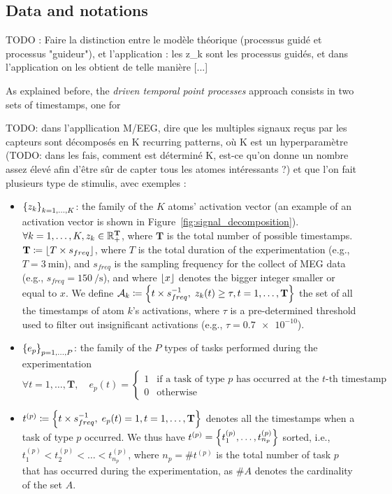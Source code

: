 \subsection{Data and notations}

TODO : Faire la distinction entre le modèle théorique (processus guidé et processus "guideur"), et l'application : les z\_k sont les processus guidés, et dans l'application on les obtient de telle manière [...] 

As explained before, the \textit{driven temporal point processes} approach consists in two sets of timestamps, one for 

TODO: dans l'appllication M/EEG, dire que les multiples signaux reçus par les capteurs sont décomposés en K recurring patterns, où K est un hyperparamètre (TODO: dans les fais, comment est déterminé K, est-ce qu'on donne un nombre assez élevé afin d'être sûr de capter tous les atomes intéressants ?) et que l'on fait plusieurs type de stimulis, avec exemples : 

\begin{itemize}
    \item $\left\lbrace z_k \right\rbrace_{k=1,\dots,K}$: the family of the $K$ atoms' activation vector (an example of an activation vector is shown in Figure~\ref{fig:signal_decomposition}).
    ${\forall k=1,\dots,K, z_k\in\mathbb{R}_+^\mathbf{T}}$, where $\mathbf{T}$ is the total number of possible timestamps.
    $\mathbf{T} \coloneqq \left\lfloor T \times s_{freq}\right\rfloor$, where $T$ is the total duration of the experimentation (e.g., $T = \SI{3}{\minute}$), and $s_{freq}$ is the sampling frequency for the collect of MEG data (e.g., $s_{freq} = \SI{150}{\per\second}$), and where $\left\lfloor x\right\rfloor$ denotes the bigger integer smaller or equal to $x$.
    We define $\mathcal{A}_k \coloneqq \left\lbrace t\times s_{freq}^{-1},\; z_k(t)\geq\tau, t=1,\dots, \mathbf{T} \right\rbrace$ the set of all the timestamps of atom $k$'s activations, where $\tau$ is a pre-determined threshold used to filter out insignificant activations (e.g., $\tau = \num{0.7e-10}$).
    
    \item $\left\lbrace e_p \right\rbrace_{p=1,\dots,P}$: the family of the $P$ types of tasks performed during the experimentation
    \begin{equation*}
        \forall t=1,\dots,\mathbf{T}, \quad e_p(t)=
        \left\{
		\begin{array}{ll}
			1 & \mbox{if a task of type $p$ has occurred at the $t$-th timestamp}\\
			0 & \mbox{otherwise}
		\end{array}
	\right.
    \end{equation*}
    
    \item $t^{(p)} \coloneqq \left\lbrace t\times s_{freq}^{-1},\; e_p(t)=1, t=1,\dots, \mathbf{T} \right\rbrace$ denotes all the timestamps when a task of type $p$ occurred.
    We thus have $t^{(p)} = \left\lbrace t^{(p)}_1, \dots, t^{(p)}_{n_p} \right\rbrace$ sorted, i.e., $t^{(p)}_1 < t^{(p)}_2 < \dots < t^{(p)}_{n_p}$, where $n_p=\# t^{(p)}$ is the total number of task $p$ that has occurred during the experimentation, as $\# A$ denotes the cardinality of the set $A$.
\end{itemize} 

